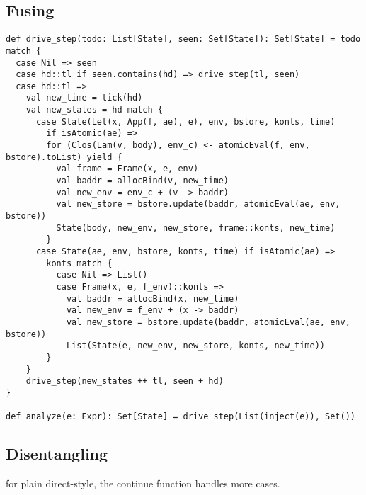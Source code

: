 \documentclass[acmsmall,review,anonymous]{acmart}\settopmatter{printfolios=true,printccs=false,printacmref=false}
\begin{document}
\subsection{Fusing}

\begin{lstlisting}
def drive_step(todo: List[State], seen: Set[State]): Set[State] = todo match {
  case Nil => seen
  case hd::tl if seen.contains(hd) => drive_step(tl, seen)
  case hd::tl =>
    val new_time = tick(hd)
    val new_states = hd match {
      case State(Let(x, App(f, ae), e), env, bstore, konts, time) 
        if isAtomic(ae) =>
        for (Clos(Lam(v, body), env_c) <- atomicEval(f, env, bstore).toList) yield {
          val frame = Frame(x, e, env)
          val baddr = allocBind(v, new_time)
          val new_env = env_c + (v -> baddr)
          val new_store = bstore.update(baddr, atomicEval(ae, env, bstore))
          State(body, new_env, new_store, frame::konts, new_time)
        }
      case State(ae, env, bstore, konts, time) if isAtomic(ae) =>
        konts match {
          case Nil => List()
          case Frame(x, e, f_env)::konts =>
            val baddr = allocBind(x, new_time)
            val new_env = f_env + (x -> baddr)
            val new_store = bstore.update(baddr, atomicEval(ae, env, bstore))
            List(State(e, new_env, new_store, konts, new_time))
        }
    }
    drive_step(new_states ++ tl, seen + hd)
}

def analyze(e: Expr): Set[State] = drive_step(List(inject(e)), Set())
\end{lstlisting}

\subsection{Disentangling}

for plain direct-style, the continue function handles more cases.
\end{document}
